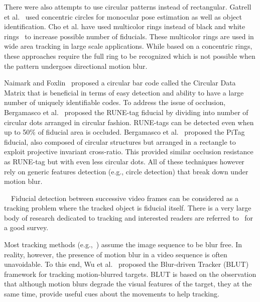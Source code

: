\documentclass[10pt,twocolumn,letterpaper]{article}
\begin{document}
There were also attempts to use circular patterns instead of rectangular.
Gatrell et al.~\cite{concentric} used concentric circles
for monocular pose estimation as well as object identification. Cho et al.
\cite{Cho:2001,Cho97fastcolor} have used multicolor rings instead of black and white rings~\cite{concentric} to increase possible number of fiducials.
These multicolor rings are used in wide area tracking in large scale
applications.  While based on a concentric rings, these approaches require
the full ring to be recognized which is not possible when the pattern undergoes directional
motion blur.

Naimark and Foxlin~\cite{NaimarkF02} proposed a circular bar code
called the Circular Data Matrix that is beneficial in terms of
easy detection and ability to have a large number
of uniquely identifiable codes.  To address the issue of occlusion,
Bergamasco et al.~\cite{runetag11} proposed the RUNE-tag fiducial by dividing
into number of circular dots arranged in circular fashion. RUNE-tags can be
detected even when up to 50\% of fiducial area is occluded. Bergamasco et
al.~\cite{Pitag13} proposed the PiTag fiducial, also composed of circular
structures but arranged in a rectangle to exploit projective invariant cross-ratio.
This provided similar occlusion resistance as RUNE-tag but with even less
circular dots. All of these techniques however rely on generic features
detection (e.g., circle detection) that break down under motion blur.


~~Fiducial detection between successive video
frames can be considered as a tracking problem where the tracked object is
fiducial itself.  There is a very large body of research dedicated to tracking and interested
readers are referred to~\cite{Yilmaz:2006} for a good survey.

Most tracking methods (e.g.,~\cite{Ross:2008,Wu:2009,Perez02,Mei:2009}) assume
the image sequence to be blur free. In reality, however, the presence of motion blur in 
a video sequence is often unavoidable. To this end, Wu et al.~\cite{Wu:2011}
proposed the Blur-driven Tracker (BLUT) framework for tracking motion-blurred targets. BLUT
is based on the observation that although motion blurs degrade the visual
features of the target, they at the same time, provide useful cues about the
movements to help tracking.
\end{document}
